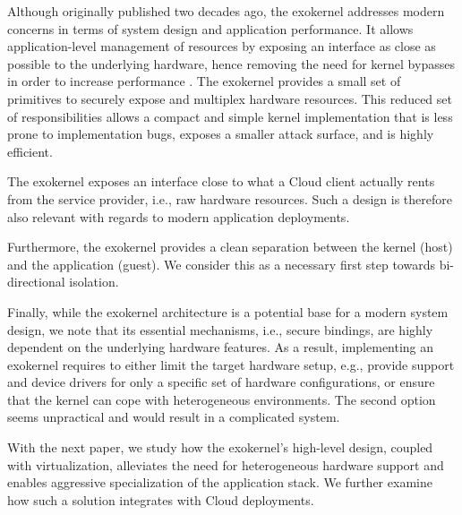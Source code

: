 Although originally published two decades ago, the exokernel addresses modern concerns in terms of system design and application performance.
It allows application-level management of resources by exposing an interface as close as possible to the underlying hardware, hence removing the need for kernel bypasses in order to increase performance \cite{BelayPKGKB14,DBLP:journals/tocs/CaoFKL96}.
The exokernel provides a small set of primitives to securely expose and multiplex hardware resources.
This reduced set of responsibilities allows a compact and simple kernel implementation that is less prone to implementation bugs, exposes a smaller attack surface, and is highly efficient.

The exokernel exposes an interface close to what a Cloud client actually rents from the service provider, i.e., raw hardware resources.
Such a design is therefore also relevant with regards to modern application deployments. 

Furthermore, the exokernel provides a clean separation between the kernel (host) and the application (guest).
We consider this as a necessary first step towards bi-directional isolation.

Finally, while the exokernel architecture is a potential base for a modern system design, we note that its essential mechanisms, i.e., secure bindings, are highly dependent on the underlying hardware features.
As a result, implementing an exokernel requires to either limit the target hardware setup, e.g., provide support and device drivers for only a specific set of hardware configurations, or ensure that the kernel can cope with heterogeneous environments.
The second option seems unpractical and would result in a complicated system.

With the next paper, we study how the exokernel's high-level design, coupled with virtualization, alleviates the need for heterogeneous hardware support and enables aggressive specialization of the application stack.
We further examine how such a solution integrates with Cloud deployments.



